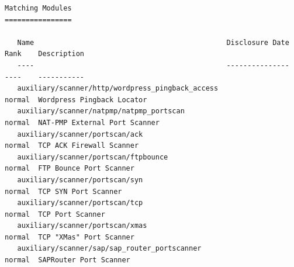 \documentclass[a4,12pt,onecolum]{article}
\begin{document}
\begin{itemize}
\begin{verbatim}
Matching Modules
================

   Name                                              Disclosure Date  Rank    Description
   ----                                              ---------------  ----    -----------
   auxiliary/scanner/http/wordpress_pingback_access                   normal  Wordpress Pingback Locator
   auxiliary/scanner/natpmp/natpmp_portscan                           normal  NAT-PMP External Port Scanner
   auxiliary/scanner/portscan/ack                                     normal  TCP ACK Firewall Scanner
   auxiliary/scanner/portscan/ftpbounce                               normal  FTP Bounce Port Scanner
   auxiliary/scanner/portscan/syn                                     normal  TCP SYN Port Scanner
   auxiliary/scanner/portscan/tcp                                     normal  TCP Port Scanner
   auxiliary/scanner/portscan/xmas                                    normal  TCP "XMas" Port Scanner
   auxiliary/scanner/sap/sap_router_portscanner                       normal  SAPRouter Port Scanner
\end{verbatim}


\end{itemize}
\end{document}
